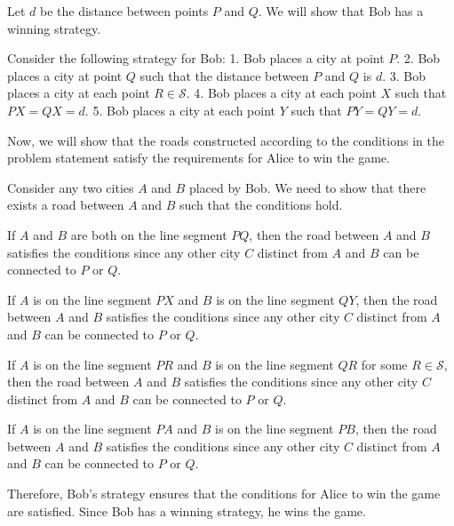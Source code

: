 Let $d$ be the distance between points $P$ and $Q$. We will show that Bob has a winning strategy.

Consider the following strategy for Bob:
1. Bob places a city at point $P$.
2. Bob places a city at point $Q$ such that the distance between $P$ and $Q$ is $d$.
3. Bob places a city at each point $R\in \mathcal{S}$.
4. Bob places a city at each point $X$ such that $PX = QX = d$.
5. Bob places a city at each point $Y$ such that $PY = QY = d$.

Now, we will show that the roads constructed according to the conditions in the problem statement satisfy the requirements for Alice to win the game.

Consider any two cities $A$ and $B$ placed by Bob. We need to show that there exists a road between $A$ and $B$ such that the conditions hold.

If $A$ and $B$ are both on the line segment $PQ$, then the road between $A$ and $B$ satisfies the conditions since any other city $C$ distinct from $A$ and $B$ can be connected to $P$ or $Q$.

If $A$ is on the line segment $PX$ and $B$ is on the line segment $QY$, then the road between $A$ and $B$ satisfies the conditions since any other city $C$ distinct from $A$ and $B$ can be connected to $P$ or $Q$.

If $A$ is on the line segment $PR$ and $B$ is on the line segment $QR$ for some $R\in \mathcal{S}$, then the road between $A$ and $B$ satisfies the conditions since any other city $C$ distinct from $A$ and $B$ can be connected to $P$ or $Q$.

If $A$ is on the line segment $PA$ and $B$ is on the line segment $PB$, then the road between $A$ and $B$ satisfies the conditions since any other city $C$ distinct from $A$ and $B$ can be connected to $P$ or $Q$.

Therefore, Bob's strategy ensures that the conditions for Alice to win the game are satisfied. Since Bob has a winning strategy, he wins the game.
